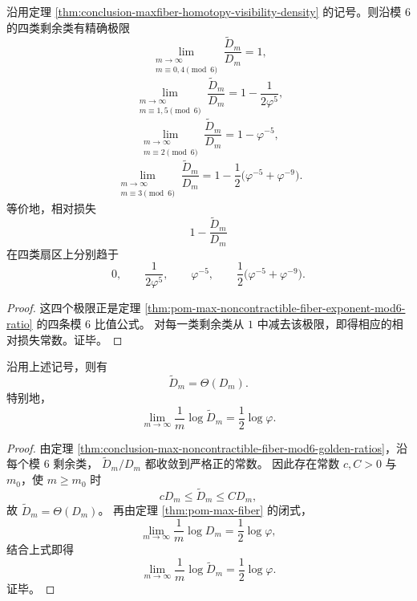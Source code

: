 \begin{theorem}\label{thm:conclusion-max-noncontractible-fiber-mod6-golden-ratios}
沿用定理 \ref{thm:conclusion-maxfiber-homotopy-visibility-density} 的记号。则沿模 \(6\) 的四类剩余类有精确极限
\[
\boxed{\;
\lim_{\substack{m\to\infty\\ m\equiv 0,4\!\!\!\!\pmod 6}}
\frac{\widetilde D_m}{D_m}=1,\;}
\]
\[
\boxed{\;
\lim_{\substack{m\to\infty\\ m\equiv 1,5\!\!\!\!\pmod 6}}
\frac{\widetilde D_m}{D_m}
=
1-\frac{1}{2\varphi^{5}},\;}
\]
\[
\boxed{\;
\lim_{\substack{m\to\infty\\ m\equiv 2\!\!\!\!\pmod 6}}
\frac{\widetilde D_m}{D_m}
=
1-\varphi^{-5},\;}
\]
\[
\boxed{\;
\lim_{\substack{m\to\infty\\ m\equiv 3\!\!\!\!\pmod 6}}
\frac{\widetilde D_m}{D_m}
=
1-\frac12\bigl(\varphi^{-5}+\varphi^{-9}\bigr).\;}
\]
等价地，相对损失
\[
1-\frac{\widetilde D_m}{D_m}
\]
在四类扇区上分别趋于
\[
0,\qquad
\frac{1}{2\varphi^5},\qquad
\varphi^{-5},\qquad
\frac12\bigl(\varphi^{-5}+\varphi^{-9}\bigr).
\]
\end{theorem}
\begin{proof}
这四个极限正是定理 \ref{thm:pom-max-noncontractible-fiber-exponent-mod6-ratio} 的四条模 \(6\) 比值公式。
对每一类剩余类从 \(1\) 中减去该极限，即得相应的相对损失常数。证毕。
\end{proof}

\begin{corollary}[非可缩最大纤维的指数率守恒]\label{cor:conclusion-max-noncontractible-fiber-exponential-rate}
沿用上述记号，则有
\[
\boxed{\;
\widetilde D_m=\Theta(D_m).\;}
\]
特别地，
\[
\boxed{\;
\lim_{m\to\infty}\frac1m\log \widetilde D_m
=
\frac12\log\varphi.\;}
\]
\end{corollary}
\begin{proof}
由定理 \ref{thm:conclusion-max-noncontractible-fiber-mod6-golden-ratios}，沿每个模 \(6\) 剩余类，
\(
\widetilde D_m/D_m
\)
都收敛到严格正的常数。
因此存在常数 \(c,C>0\) 与 \(m_0\)，使 \(m\ge m_0\) 时
\[
cD_m\le \widetilde D_m\le CD_m,
\]
故 \(\widetilde D_m=\Theta(D_m)\)。
再由定理 \ref{thm:pom-max-fiber} 的闭式，
\[
\lim_{m\to\infty}\frac1m\log D_m=\frac12\log\varphi,
\]
结合上式即得
\[
\lim_{m\to\infty}\frac1m\log \widetilde D_m=\frac12\log\varphi.
\]
证毕。
\end{proof}

